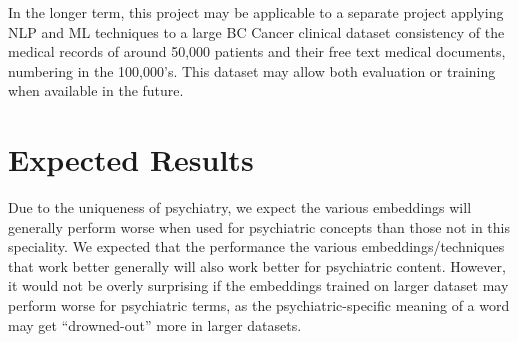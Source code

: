 \documentclass[10pt]{article}
\begin{document}
In the longer term, this project may be applicable to a separate project applying NLP and ML techniques to a large BC Cancer clinical dataset consistency of the medical records of around 50,000 patients and their free text medical documents, numbering in the 100,000's. This dataset may allow both evaluation or training when available in the future. 

\section{Expected Results}

Due to the uniqueness of psychiatry, we expect the various embeddings will generally perform worse when used for psychiatric concepts than those not in this speciality. We expected that the performance the various embeddings/techniques that work better generally will also work better for psychiatric content. However, it would not be overly surprising if the embeddings trained on larger dataset may perform worse for psychiatric terms, as the psychiatric-specific meaning of a word may get ``drowned-out'' more in larger datasets. 
%
%
%
%
\end{document}

